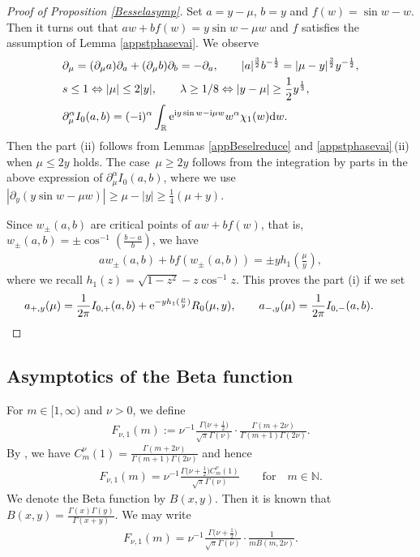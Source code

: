 \documentclass[10pt,a4paper]{amsart}
\numberwithin{equation}{section}
\def\R{\mathbb{R}}%
\def\a{\alpha}
\def\l{\lambda}
\def\m{\mu}
\def\n{\nu}
\def\pa{\partial}
\begin{document}
\begin{proof}[Proof of Proposition \ref{Besselasymp}]
Set $a=y-\m$, $b=y$ and $f(w)=\sin w-w$. Then it turns out that $aw+bf(w)=y\sin w-\m w$ and $f$ satisfies the assumption of Lemma \ref{appstphasevai}. We observe
\begin{align*}
&\pa_{\m}=(\pa_{\m} a)\pa_{a}+(\pa_{\m} b)\pa_{b}=-\pa_a,\qquad |a|^{\frac{3}{2}}b^{-\frac{1}{2}}=|\m-y|^{\frac{3}{2}}y^{-\frac{1}{2}},\\
&s\leq 1\Leftrightarrow |\m|\leq 2|y|,\qquad \l\geq 1/8\Leftrightarrow |y-\m|\geq \frac{1}{2}y^{\frac{1}{3}},\\
&\pa_{\m}^{\a}I_0(a,b)=(-{\rm i})^{\a}\int_{\R}{\rm e}^{{\rm i}y \sin w-{\rm i}\m w }w^{\a}\chi_1(w){\rm d}w.
\end{align*}
Then the part (ii) follows from Lemmas \ref{appBeselreduce} and \ref{appstphasevai}\,(ii) when $\m\leq 2y$ holds. The case~${\m\geq 2y}$ follows from the integration by parts in the above expression of $\pa_{\m}^{\a}I_0(a,b)$, where we use $|\pa_y(y \sin w-\m w)|\geq \m-|y|\geq \frac{1}{4}(\m+y)$.

Since $w_{\pm}(a,b)$ are critical points of $aw+bf(w)$, that is, $w_{\pm}(a,b)=\pm\cos^{-1}(\frac{b-a}{b})$, we have
\begin{align*}
aw_{\pm}(a,b)+bf(w_{\pm}(a,b))=\pm yh_1\left(\frac{\m}{y}\right),
\end{align*}
where we recall $h_1(z)=\sqrt{1-z^2}-z\cos^{-1}z$. This proves the part (i) if we set
\begin{align*}
a_{+,y}(\m)=\frac{1}{2\pi}I_{0,+}(a,b)+ {\rm e}^{-yh_1(\frac{\m}{y})} R_0(\m,y),\qquad a_{-,y}(\m)=\frac{1}{2\pi}I_{0,-}(a,b).\tag*{\qed}
\end{align*}\renewcommand{\qed}{}
\end{proof}

\subsection{Asymptotics of the Beta function}\label{subsecasymbeta}

For $m\in [1,\infty)$ and $\n>0$, we define
\begin{align}\label{Fnu1def}
F_{\n,1}(m):=\n^{-1}\frac{\Gamma\bigl(\n+\frac{1}{2}\bigr)}{\sqrt{\pi}\Gamma(\n)}\cdot \frac{\Gamma(m+2\n)}{\Gamma(m+1)\Gamma(2\n)}.
\end{align}
By \cite[Fact 4.8, equation~(4.30)]{BKO}, we have $C_m^{\n}(1)=\frac{\Gamma(m+2\n)}{\Gamma(m+1)\Gamma(2\n)}$ and hence
\begin{align}\label{Fnu1Gegen}
F_{\n,1}(m)=\n^{-1}\frac{\Gamma\bigl(\n+\frac{1}{2}\bigr)C_m^{\n}(1)}{\sqrt{\pi}\Gamma(\n)}\qquad \text{for}\quad m\in\mathbb{N}.
\end{align}
We denote the Beta function by $B(x,y)$. Then it is known that $B(x,y)=\frac{\Gamma(x)\Gamma(y)}{\Gamma(x+y)}$. We may write
\begin{align}\label{Fnu1beta}
F_{\n,1}(m)=\n^{-1}\frac{\Gamma\bigl(\n+\frac{1}{2}\bigr)}{\sqrt{\pi}\Gamma(\n)}\cdot \frac{1}{mB(m,2\n)}.
\end{align}
\end{document}

